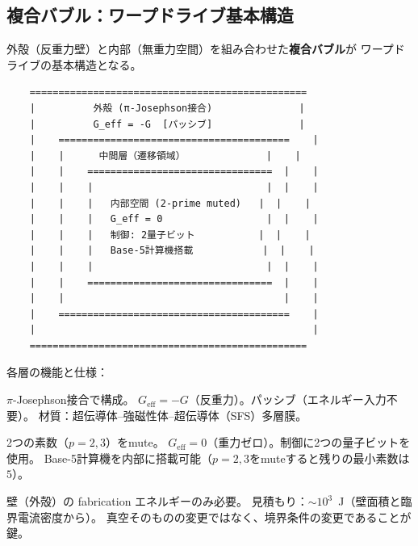 \documentclass[11pt,a4paper]{article}
\newcommand{\Geff}{G_{\mathrm{eff}}}
\begin{document}
\subsection{複合バブル：ワープドライブ基本構造}
\label{sec:13.4}

外殻（反重力壁）と内部（無重力空間）を組み合わせた\textbf{複合バブル}が
ワープドライブの基本構造となる。

\begin{tcolorbox}[colback=gray!5!white, colframe=gray!70!black, title=複合バブル構造（断面図）]
\begin{verbatim}
    ================================================
    |          外殻 (π-Josephson接合)               |
    |          G_eff = -G  [パッシブ]               |
    |    ========================================    |
    |    |      中間層（遷移領域）              |    |
    |    |    ================================  |    |
    |    |    |                              |  |    |
    |    |    |   内部空間 (2-prime muted)   |  |    |
    |    |    |   G_eff = 0                  |  |    |
    |    |    |   制御: 2量子ビット           |  |    |
    |    |    |   Base-5計算機搭載            |  |    |
    |    |    |                              |  |    |
    |    |    ================================  |    |
    |    |                                      |    |
    |    ========================================    |
    |                                                |
    ================================================
\end{verbatim}
\end{tcolorbox}

\noindent
各層の機能と仕様：

\begin{description}[leftmargin=2em]
\item[外殻（$\pi$-接合層）] $\pi$-Josephson接合で構成。
$\Geff = -G$（反重力）。パッシブ（エネルギー入力不要）。
材質：超伝導体--強磁性体--超伝導体（SFS）多層膜。

\item[内部（muted真空）] 2つの素数（$p=2, 3$）をmute。
$\Geff = 0$（重力ゼロ）。制御に2つの量子ビットを使用。
Base-5計算機を内部に搭載可能（$p=2,3$をmuteすると残りの最小素数は$5$）。

\item[エネルギー] 壁（外殻）の fabrication エネルギーのみ必要。
見積もり：$\sim 10^3$~J（壁面積と臨界電流密度から）。
真空そのものの変更ではなく、境界条件の変更であることが鍵。
\end{description}
\end{document}
